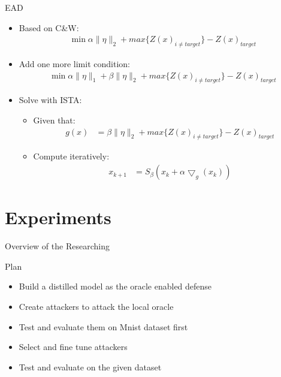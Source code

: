 \documentclass[
 size=12pt,
 paper=smartboard, %
 mode=present, %
 display=slides, %
style=tuliplab,
pauseslide,
fleqn,leqno]{powerdot}
\begin{document}
\begin{slide}{EAD\cite{RN139}}
  \begin{itemize}
    \item Based on C\&W: \pause
    \begin{equation}
      \begin{split}
      \min {\alpha\|\eta\|_2 + max\{Z(x)_{i\neq target}\}-Z(x)_{target}}
      \end{split}
    \end{equation} \pause
    \item Add one more limit condition:
    \begin{equation}
      \begin{split}
      \min {\alpha\|\eta\|_1 + \beta\|\eta\|_2 + max\{Z(x)_{i\neq target}\}-Z(x)_{target}}
      \end{split}
    \end{equation} \pause
    \item Solve with ISTA:
    \begin{itemize}
      \item Given that:
      \begin{equation}
        \begin{split}
          g(x) &= \beta\|\eta\|_2 + max\{Z(x)_{i\neq target}\}-Z(x)_{target}
        \end{split}
      \end{equation}
      \item Compute iteratively:
      \begin{equation}
        \begin{split}
          x_{k+1} &= S_{\beta}(x_{k} + \alpha \bigtriangledown_g(x_k))
        \end{split}
      \end{equation}
    \end{itemize}
  \end{itemize}
\end{slide}

\section{Experiments}

\begin{slide}[toc=,bm=]{Overview of the Researching}
\tableofcontents[content=currentsection,type=0]
\end{slide}

\begin{slide}{Plan}
  \begin{itemize}
    \item Build a distilled model as the oracle enabled defense \pause
    \item Create attackers to attack the local oracle \pause
    \item Test and evaluate them on Mnist dataset first \pause
    \item Select and fine tune attackers \pause
    \item Test and evaluate on the given dataset \pause
  \end{itemize}
\end{slide}
\end{document}
